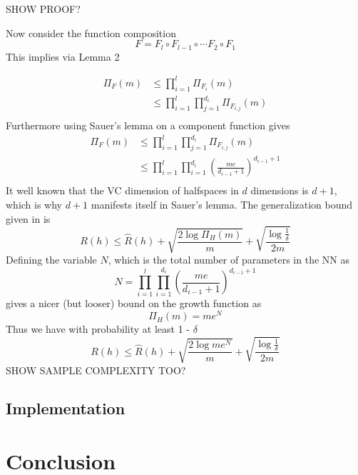 \documentclass{article} %
\begin{document}
SHOW PROOF?


Now consider the function composition
$$
F = F_l \circ F_{l-1} \circ \cdots F_2 \circ F_1
$$
This implies via Lemma 2

\begin{align*}
\Pi_F(m) &\leq \prod_{i=1}^l \Pi_{F_i}(m)\\
& \leq \prod_{i=1}^l\prod_{j=1}^{d_i} \Pi_{F_{i,j}}(m)\\
\end{align*}
Furthermore using Sauer's lemma on a component function gives
\begin{align*}
\Pi_F(m)& \leq \prod_{i=1}^l\prod_{j=1}^{d_i} \Pi_{F_{i,j}}(m)\\
& \leq \prod_{i=1}^l\prod_{i=1}^{d_i}(\frac{me}{d_{i-1}+1})^{d_{i-1}+1}\\
\end{align*}
It well known that the VC dimension of halfspaces in $d$ dimensions is $d +1$, which is why $d+1$ manifests itself in Sauer's lemma.
The generalization bound given in \cite{mohri_foundations_2012} is 
$$
R(h) \leq \widehat{R}(h) + \sqrt{\frac{2\log{\Pi_H{(m)}}}{m}} + \sqrt{\frac{\log{\frac{1}{\delta}}}{2m}}
$$
Defining the variable $N$, which is the total number of parameters in the NN as 
$$
N = \prod_{i=1}^l\prod_{i=1}^{d_i}(\frac{me}{d_{i-1}+1})^{d_{i-1}+1}
$$ 
gives a nicer (but looser) bound on the growth function as
$$
\Pi_H{(m)} = me^N
$$
Thus we have with probability at least 1 - $\delta$
$$
R(h) \leq \widehat{R}(h) + \sqrt{\frac{2\log{me^N}}{m}} + \sqrt{\frac{\log{\frac{1}{\delta}}}{2m}}
$$
SHOW SAMPLE COMPLEXITY TOO?
\subsection{Implementation}

\section{Conclusion}



\nocite{yang_multiagent_2004}
\nocite{kim_autonomous_2003}
\nocite{mohri_foundations_2012}

\newpage
{}





\end{document}
